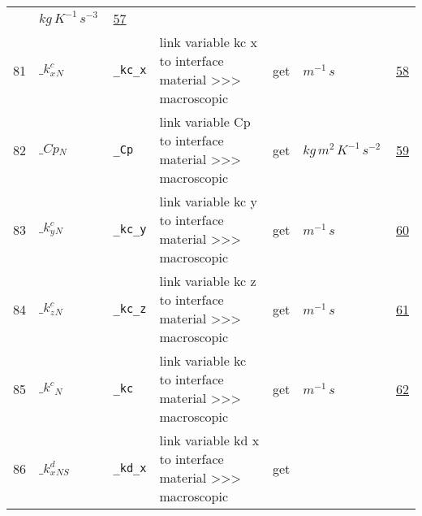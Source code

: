 \begin{longtable}{|p{1cm}|p{2.5cm}|p{4.5cm}|p{8cm}|p{3.0cm}|p{3cm}|p{1cm}|}
             & $ kg \,K^{-1} \,s^{-3} \, $
             &                 \hyperlink{"e:57"}{ 57 }
                 \\
            81
             & \hypertarget{"v:81"}{ $ {{\_k^c_x}}{_{N}} $}
             & \verb|_kc_x|
             & link variable kc x to interface material >>> macroscopic
             & \begin{lay}get \end{lay}
             & $ m^{-1} \,s \, $
             &                 \hyperlink{"e:58"}{ 58 }
                 \\
            82
             & \hypertarget{"v:82"}{ $ {{\_Cp}}{_{N}} $}
             & \verb|_Cp|
             & link variable Cp to interface material >>> macroscopic
             & \begin{lay}get \end{lay}
             & $ kg \,m^{2} \,K^{-1} \,s^{-2} \, $
             &                 \hyperlink{"e:59"}{ 59 }
                 \\
            83
             & \hypertarget{"v:83"}{ $ {{\_k^c_y}}{_{N}} $}
             & \verb|_kc_y|
             & link variable kc y to interface material >>> macroscopic
             & \begin{lay}get \end{lay}
             & $ m^{-1} \,s \, $
             &                 \hyperlink{"e:60"}{ 60 }
                 \\
            84
             & \hypertarget{"v:84"}{ $ {{\_k^c_z}}{_{N}} $}
             & \verb|_kc_z|
             & link variable kc z to interface material >>> macroscopic
             & \begin{lay}get \end{lay}
             & $ m^{-1} \,s \, $
             &                 \hyperlink{"e:61"}{ 61 }
                 \\
            85
             & \hypertarget{"v:85"}{ $ {{\_k^c}}{_{N}} $}
             & \verb|_kc|
             & link variable kc to interface material >>> macroscopic
             & \begin{lay}get \end{lay}
             & $ m^{-1} \,s \, $
             &                 \hyperlink{"e:62"}{ 62 }
                 \\
            86
             & \hypertarget{"v:86"}{ $ {{\_k^d_x}}{_{{N S}}} $}
             & \verb|_kd_x|
             & link variable kd x to interface material >>> macroscopic
             & \begin{lay}get \end{lay}

\end{longtable}
